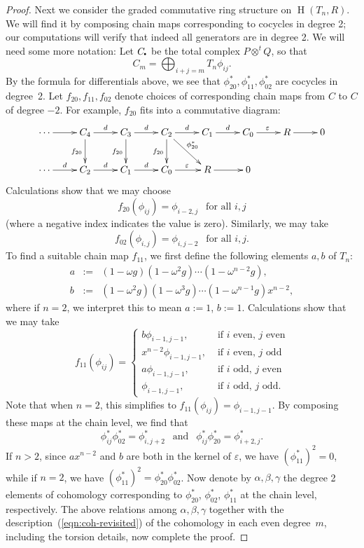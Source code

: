 \documentclass[11pt]{amsart}
\numberwithin{equation}{section}
\theoremstyle{definition}
\theoremstyle{remark}
\newcommand{\om}{\omega}
\newcommand\Homol{\operatorname{H}}
\newcommand\coh{\Homol}
\newcommand\ott{\otimes^{t}\!}
\newcommand{\DOT}{\setlength{\unitlength}{1pt}
     \begin{picture}(2.5,2)(1,1)\put(2,3){\circle*{2}}\end{picture}}
\newcommand{\bu}{\DOT}
\begin{document}
\begin{proof}
Next we consider the graded commutative ring structure
on $\coh(T_n,R)$.
We will find it by composing chain maps corresponding to
cocycles in degree 2;
our computations will verify that indeed all
generators are in degree 2.
We will need some more notation:
Let $C_{\bu}$ be the total complex $P\ott Q$, so that
\[
   C_m = \bigoplus_{i+j=m} T_n \phi_{ij}.
\]
By the formula for differentials above, we see that
$\phi^*_{20}, \phi^*_{11}, \phi^*_{02}$ are cocycles in degree~2.
Let $f_{20}, f_{11}, f_{02}$ denote choices of corresponding
chain maps from $C$ to $C$ of degree $-2$.
For example, $f_{20}$ fits into a commutative diagram: 
\[
\xymatrix{
  \cdots \ar[r] & C_4\ar[r]^{d}\ar[d]_{f_{20}} & C_3\ar[r]^{d}\ar[d]_{f_{20}}
    & C_2\ar[r]^{d}\ar[d]_{f_{20}} \ar[dr]^{\hspace{-.1cm}\phi_{20}^*} 
    & C_1\ar[r]^{d} 
    & C_0\ar[r]^{\varepsilon} &   R \ar[r] & 0 \\
  \cdots \ar[r]^{d} & C_2\ar[r]^{d} & C_1\ar[r]^{d} & C_0 \ar[r]^{\varepsilon} 
  & R\ar[r] & 0 & &   
}
\]
Calculations show that we may choose
\[
   f_{20}(\phi_{ij}) = \phi_{i-2 , j} \ \ \mbox{ for all }i,j
\] 
(where a negative index indicates the value is zero). 
Similarly, we may take   
\[ 
  f_{02}(\phi_{i,j}) = \phi_{i,j-2} \ \ \mbox{ for all }i,j.
\]
To find a suitable chain map $f_{11}$,
we first define the following elements $a,b$ of $T_n$:
\begin{eqnarray*}
   a & := & (1-\om g) (1-\om ^2 g)\cdots (1-\om^{n-2} g), \\
   b & := & (1-\om ^2 g)(1-\om^3 g)\cdots (1-\om^{n-1}g) x^{n-2},
\end{eqnarray*} 
where if $n=2$, we interpret this to mean $a:=1$, $b:=1$. 
Calculations show that we may take  
\[
   f_{11}(\phi_{ij}) = \left\{\begin{array}{ll}
   b\phi_{i-1, j-1}, & \mbox{ if $i$ even, $j$ even}\\
   x^{n-2}\phi_{i-1,j-1}, & \mbox{ if $i$ even, $j$ odd}\\
  a \phi_{i-1,j-1},& \mbox{ if $i$ odd, $j$ even}\\
   \phi_{i-1,j-1},& \mbox{ if $i$ odd, $j$ odd} .
  \end{array} \right.
\]
Note that when $n=2$, this simplifies to $f_{11}(\phi_{ij}) = \phi_{i-1,j-1}$.
By composing these maps at the chain level, 
we find that 
\[
  \phi^*_{ij} \phi^*_{02} = \phi^*_{i, j+2}
  \ \ \mbox{ and } \ \ 
  \phi^*_{ij} \phi^*_{20} = \phi^*_{i+2, j}.
\]
If $n>2$, since $ax^{n-2}$ and $b$ are both in the kernel of $\varepsilon$, 
we have $(\phi^*_{11})^2 =0$,
while if $n=2$, we have $(\phi_{11}^*)^2 = \phi^*_{20}\phi^*_{02}$.
Now denote by $\alpha, \beta, \gamma$ the degree 2 elements of cohomology  
corresponding to $\phi_{20}^*$,
$\phi_{02}^*$, $\phi_{11}^*$ at the chain level, respectively. 
The above relations among $\alpha, \beta, \gamma$
together with the description~(\ref{eqn:coh-revisited}) of the cohomology
in each even degree~$m$, including the torsion details, now complete the proof.
\end{proof}
\end{document}
